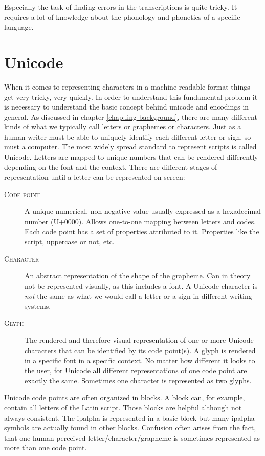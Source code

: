 Especially the task of finding errors in the transcriptions is quite tricky. It requires a lot of knowledge about the phonology and phonetics of a specific language. 

\section{Unicode}
When it comes to representing characters in a machine-readable format things get very tricky, very quickly. In order to understand this fundamental problem it is necessary to understand the basic concept behind unicode and encodings in general. As discussed in chapter \ref{chap:ling-background}, there are many different kinds of what we typically call letters or graphemes or characters. Just as a human writer must be able to uniquely identify each different letter or sign, so must a computer. The most widely spread standard to represent scripts is called Unicode. Letters are mapped to unique numbers that can be rendered differently depending on the font and the context. There are different stages of representation until a letter can be represented on screen:

\begin{description}
\item[\textsc{Code point}] A unique numerical, non-negative value usually expressed as a hexadecimal number (U+0000). Allows one-to-one mapping between letters and codes. Each code point has a set of properties attributed to it. Properties like the script, uppercase or not, etc.
\item[\textsc{Character}] An abstract representation of the shape of the grapheme. Can in theory not be represented visually, as this includes a font. A Unicode character is \textit{not} the same as what we would call a letter or a sign in different writing systems.
\item[\textsc{Glyph}] The rendered and therefore visual representation of one or more Unicode characters that can be identified by its code point(s). A glyph is rendered in a specific font in a specific context. No matter how different it looks to the user, for Unicode all different representations of one code point are exactly the same. Sometimes one character is represented as two glyphs.
\end{description}

Unicode code points are often organized in blocks. A block can, for example, contain all letters of the Latin script. Those blocks are helpful although not always consistent. The \ac{ipalpha} is represented in a basic block but many \ac{ipalpha} symbols are actually found in other blocks. Confusion often arises from the fact, that one human-perceived letter/character/grapheme is sometimes represented as more than one code point. 

